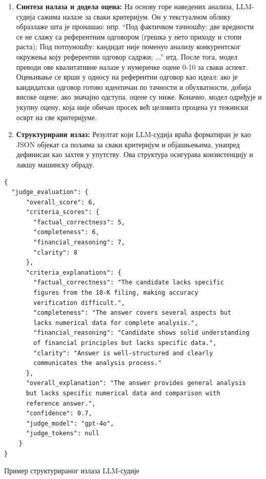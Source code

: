 \begin{enumerate}
    \item \textbf{Синтеза налаза и додела оцена:} На основу горе наведених анализа, LLM-судија сажима налазе за сваки критеријум. Он у текстуалном облику образлаже шта је пронашао: нпр. ``Под фактичком тачношћу: две вредности се не слажу са референтним одговором (грешка у нето приходу и стопи раста); Под потпуношћу: кандидат није поменуо анализу конкурентског окружења коју референтни одговор садржи; ...'' итд. После тога, модел преводи ове квалитативне налазе у нумеричке оцене 0-10 за сваки аспект. Оцењивање се врши у односу на референтни одговор као идеал: ако је кандидатски одговор готово идентичан по тачности и обухватности, добија високе оцене; ако значајно одступа, оцене су ниже. Коначно, модел одређује и укупну оцену, која није обичан просек већ целовита процена уз тежински осврт на све критеријуме.

    \item \textbf{Структурирани излаз:} Резултат који LLM-судија враћа форматиран је као JSON објекат са пољима за сваки критеријум и објашњењима, унапред дефинисан као захтев у упутству. Ова структура осигурава конзистенцију и лакшу машинску обраду.
\end{enumerate}

\begin{center}
\begin{listing}[!ht]
\begin{verbatim}
{
  "judge_evaluation": {
      "overall_score": 6,
      "criteria_scores": {
        "factual_correctness": 5,
        "completeness": 6,
        "financial_reasoning": 7,
        "clarity": 8
      },
      "criteria_explanations": {
        "factual_correctness": "The candidate lacks specific 
        figures from the 10-K filing, making accuracy 
        verification difficult.",
        "completeness": "The answer covers several aspects but 
        lacks numerical data for complete analysis.",
        "financial_reasoning": "Candidate shows solid understanding 
        of financial principles but lacks specific data.",
        "clarity": "Answer is well-structured and clearly 
        communicates the analysis process."
      },
      "overall_explanation": "The answer provides general analysis 
      but lacks specific numerical data and comparison with 
      reference answer.",
      "confidence": 0.7,
      "judge_model": "gpt-4o",
      "judge_tokens": null
    }
}
\end{verbatim}
\caption{Пример структурираног излаза LLM-судије}\label{lst:llm_judge_output}
\end{listing}
\end{center}

